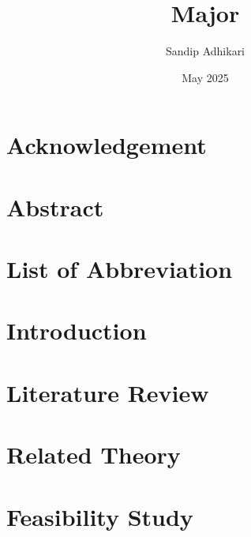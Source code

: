 \documentclass[12pt,a4paper]{report}
\title{Major}
\author{Sandip Adhikari}
\date{May 2025}
\begin{document}



\chapter*{Acknowledgement}
\label{acknowledgement}


\chapter*{Abstract}
\label{abstract}


\tableofcontents
\thispagestyle{empty}
\addtocounter{page}{-1}
\newpage

\listoffigures
{}
\newpage

\listoftables
{}
\newpage

\chapter*{List of Abbreviation}
\label{abbreviation}

\newpage


\chapter{Introduction}
\label{introduction}


\chapter{Literature Review}
\label{literaturereview}


\chapter{Related Theory}
\label{relatedtheory}


\chapter{Feasibility Study}
\label{feasiblity}

\end{document}
